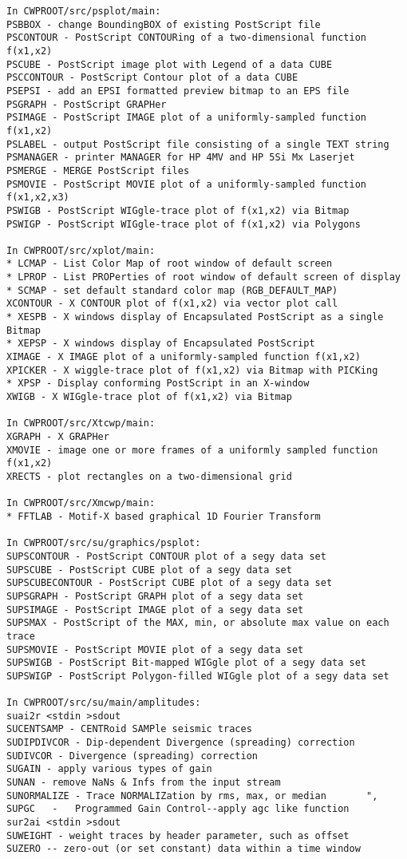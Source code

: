 {{\begin{verbatim}
In CWPROOT/src/psplot/main:
PSBBOX - change BoundingBOX of existing PostScript file	
PSCONTOUR - PostScript CONTOURing of a two-dimensional function f(x1,x2)
PSCUBE - PostScript image plot with Legend of a data CUBE       
PSCCONTOUR - PostScript Contour plot of a data CUBE		        
PSEPSI - add an EPSI formatted preview bitmap to an EPS file		
PSGRAPH - PostScript GRAPHer						
PSIMAGE - PostScript IMAGE plot of a uniformly-sampled function f(x1,x2)
PSLABEL - output PostScript file consisting of a single TEXT string	
PSMANAGER - printer MANAGER for HP 4MV and HP 5Si Mx Laserjet 
PSMERGE - MERGE PostScript files					
PSMOVIE - PostScript MOVIE plot of a uniformly-sampled function f(x1,x2,x3)
PSWIGB - PostScript WIGgle-trace plot of f(x1,x2) via Bitmap		
PSWIGP - PostScript WIGgle-trace plot of f(x1,x2) via Polygons	

In CWPROOT/src/xplot/main:
* LCMAP - List Color Map of root window of default screen 
* LPROP - List PROPerties of root window of default screen of display 
* SCMAP - set default standard color map (RGB_DEFAULT_MAP)
XCONTOUR - X CONTOUR plot of f(x1,x2) via vector plot call		
* XESPB - X windows display of Encapsulated PostScript as a single Bitmap
* XEPSP - X windows display of Encapsulated PostScript
XIMAGE - X IMAGE plot of a uniformly-sampled function f(x1,x2)     	
XPICKER - X wiggle-trace plot of f(x1,x2) via Bitmap with PICKing	
* XPSP - Display conforming PostScript in an X-window
XWIGB - X WIGgle-trace plot of f(x1,x2) via Bitmap			

In CWPROOT/src/Xtcwp/main:
XGRAPH - X GRAPHer							
XMOVIE - image one or more frames of a uniformly sampled function f(x1,x2)
XRECTS - plot rectangles on a two-dimensional grid			

In CWPROOT/src/Xmcwp/main:
* FFTLAB - Motif-X based graphical 1D Fourier Transform

In CWPROOT/src/su/graphics/psplot:
SUPSCONTOUR - PostScript CONTOUR plot of a segy data set		
SUPSCUBE - PostScript CUBE plot of a segy data set			
SUPSCUBECONTOUR - PostScript CUBE plot of a segy data set		
SUPSGRAPH - PostScript GRAPH plot of a segy data set			
SUPSIMAGE - PostScript IMAGE plot of a segy data set			
SUPSMAX - PostScript of the MAX, min, or absolute max value on each trace
SUPSMOVIE - PostScript MOVIE plot of a segy data set			
SUPSWIGB - PostScript Bit-mapped WIGgle plot of a segy data set	
SUPSWIGP - PostScript Polygon-filled WIGgle plot of a segy data set	

In CWPROOT/src/su/main/amplitudes:
suai2r <stdin >sdout 						
SUCENTSAMP - CENTRoid SAMPle seismic traces			
SUDIPDIVCOR - Dip-dependent Divergence (spreading) correction	
SUDIVCOR - Divergence (spreading) correction				
SUGAIN - apply various types of gain				  	
SUNAN - remove NaNs & Infs from the input stream		
SUNORMALIZE - Trace NORMALIZation by rms, max, or median       ", 
SUPGC   -   Programmed Gain Control--apply agc like function	
sur2ai <stdin >sdout 						
SUWEIGHT - weight traces by header parameter, such as offset		
SUZERO -- zero-out (or set constant) data within a time window	


\end{verbatim}}}
